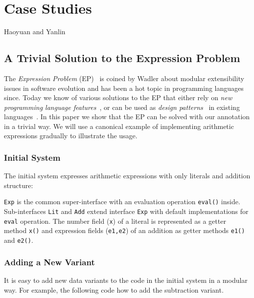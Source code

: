\section{Case Studies}
Haoyuan and Yanlin

\subsection{A Trivial Solution to the Expression Problem}

The \emph{Expression Problem} (EP)~\cite{wadler98expression-problem} is coined
by Wadler about modular extensibility issues in software evolution and has been
a hot topic in programming languages since. Today we know of various solutions
to the EP that either rely on \emph{new programming language
  features}~\cite{chambers95multimethods,clifton00multiJava,madsen89virtual,nystrom06j,bruce98astatically,McDirmid01jiazzi,garrigue98polymorphic,zenger01extensible,loh06open,wehr11javaGI},
or can be used as \emph{design patterns}~\cite{gof} in existing
languages~\cite{torgersen04theexpression,oliveira06extensible,wouter08datatypes,oliveira09modular,oliveira12extensibility}. In
this paper we show that the EP can be solved with our \mixin annotation in a
trivial way. We will use a canonical example of implementing arithmetic
expressions gradually to illustrate the usage. 

\subsubsection{Initial System}
The initial system expresses arithmetic expressions with only literals and
addition structure:


\texttt{Exp} is the common super-interface with an evaluation operation
\texttt{eval()} inside. Sub-interfaces \texttt{Lit} and \texttt{Add} extend
interface \texttt{Exp} with default implementations for \texttt{eval}
operation. The number field (\texttt{x}) of a literal is represented as a getter
method \texttt{x()} and expression fields (\texttt{e1,e2}) of an addition as
getter methods \texttt{e1()} and \texttt{e2()}.

\subsubsection{Adding a New Variant}
It is easy to add new data variants to the code in the initial system in a
modular way. For example, the following code how to add the subtraction variant.

